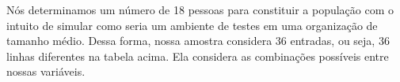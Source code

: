 Nós determinamos um número de 18 pessoas para constituir a população com o intuito de simular como seria um ambiente de testes em uma organização de tamanho médio. Dessa forma, nossa amostra considera 36 entradas, ou seja, 36 linhas diferentes na tabela acima. Ela considera as combinações possíveis entre nossas variáveis.

